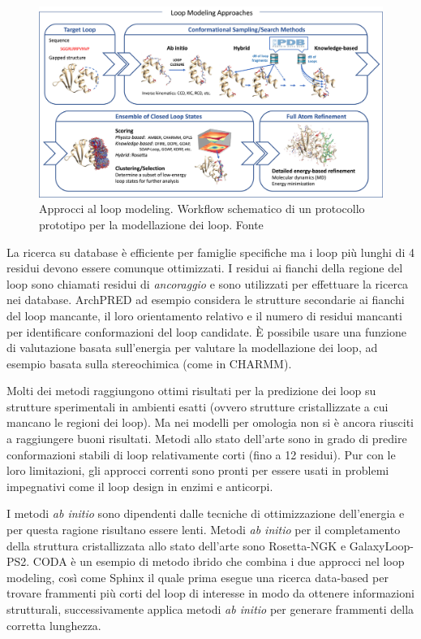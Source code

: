 {{\begin{figure}[!htb]
	\centering
	\includegraphics[scale=1]{images/loop-modeling-approaches.jpg}
	\caption{Approcci al loop modeling. Workflow schematico di un protocollo prototipo per la modellazione dei loop. Fonte\cite{barozet2021current}}
	\label{fig:loop-modeling-approaches}
\end{figure}

La ricerca su database è efficiente per famiglie specifiche ma i loop più lunghi di 4 residui devono essere comunque ottimizzati. I residui ai fianchi della regione del loop sono chiamati residui di \textit{ancoraggio} e sono utilizzati per effettuare la ricerca nei database. ArchPRED ad esempio considera le strutture secondarie ai fianchi del loop mancante, il loro orientamento relativo e il numero di residui mancanti per identificare conformazioni del loop candidate. È possibile usare una funzione di valutazione basata sull'energia per valutare la modellazione dei loop, ad esempio basata sulla stereochimica (come in CHARMM). 

\par Molti dei metodi raggiungono ottimi risultati per la predizione dei loop su strutture sperimentali in ambienti esatti (ovvero strutture cristallizzate a cui mancano le regioni dei loop). Ma nei modelli per omologia non si è ancora riusciti a raggiungere buoni risultati\supercite{karami2018dareus}. Metodi allo stato dell'arte sono in grado di predire conformazioni stabili di loop relativamente corti (fino a 12 residui)\supercite{barozet2021current}.
Pur con le loro limitazioni, gli approcci correnti sono pronti per essere usati in problemi impegnativi come il loop design in enzimi e anticorpi.

\par I metodi \textit{ab initio} sono dipendenti dalle tecniche di ottimizzazione dell'energia e per questa ragione risultano essere lenti. Metodi \textit{ab initio} per il completamento della struttura cristallizzata allo stato dell'arte sono Rosetta-NGK e GalaxyLoop-PS2. CODA è un esempio di metodo ibrido che combina i due approcci nel loop modeling, così come Sphinx il quale prima esegue una ricerca data-based per trovare frammenti più corti del loop di interesse in modo da ottenere informazioni strutturali, successivamente applica metodi \textit{ab initio} per generare frammenti della corretta lunghezza. \\

}}
